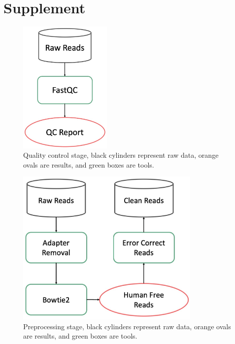 
\section*{Supplement}

\setcounter{figure}{0}
\makeatletter 
\renewcommand{\thefigure}{S\@arabic\c@figure}
\makeatother

\begin{figure}
  \begin{center}
    \includegraphics[width=0.4\textwidth]{figs/sfig_qc.jpeg}
	\caption{\small{
	    Quality control stage, black cylinders represent raw data, orange ovals are results, and green boxes are tools.
	}}
    \label{fig:qc}
  \end{center}
\end{figure}

\begin{figure}
  \begin{center}
    \includegraphics[width=0.8\textwidth]{figs/sfig_pre.jpeg}
	\caption{\small{
	    Preprocessing stage, black cylinders represent raw data, orange ovals are results, and green boxes are tools.
	}}
    \label{fig:pre}
  \end{center}
\end{figure}


